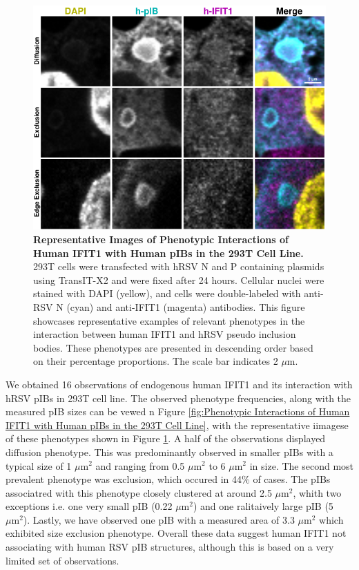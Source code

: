 \begin{figure}
    \centering
    \includegraphics[width=1\linewidth]{09. Chapter 4/Figs/01. pIB/02. IFIT1/03. i1-293t-hnhp.pdf}
    \caption[Representative Images of Phenotypic Interactions of Human IFIT1 with Human pIBs in the 293T Cell Line.]{\textbf{Representative Images of Phenotypic Interactions of Human IFIT1 with Human pIBs in the 293T Cell Line.} 293T cells were transfected with hRSV N and P containing plasmids using TransIT-X2 and were fixed after 24 hours. Cellular nuclei were stained with DAPI (yellow), and cells were double-labeled with anti-RSV N (cyan) and anti-IFIT1 (magenta) antibodies. This figure showcases representative examples of relevant phenotypes in the interaction between human IFIT1 and hRSV pseudo inclusion bodies. These phenotypes are presented in descending order based on their percentage proportions. The scale bar indicates 2 \(\mu \mbox{m}\).}
    \label{fig:Representative Images of Phenotypic Interactions of Human IFIT1 with Human pIBs in the 293T Cell Line}
\end{figure}


We obtained 16 observations of endogenous human IFIT1 and its interaction with hRSV pIBs in 293T cell line. The observed phenotype frequencies, along with the measured pIB sizes can be vewed n Figure \ref{fig:Phenotypic Interactions of Human IFIT1 with Human pIBs in the 293T Cell Line}, with the representative iimagese of these phenotypes shown in Figure \ref{fig:Representative Images of Phenotypic Interactions of Human IFIT1 with Human pIBs in the 293T Cell Line}. A half of the observations displayed diffusion phenotype. This was predominantly observed in smaller pIBs with a typical size of 1 \(\mu \mbox{m}^2\) and ranging from 0.5 \(\mu \mbox{m}^2\) to 6 \(\mu \mbox{m}^2\) in size. The second most prevalent phenotype was exclusion, which occured in 44\% of cases. The pIBs associatred with this phenotype closely clustered at around 2.5 \(\mu \mbox{m}^2\), whith two exceptions i.e. one very small pIB (0.22 \(\mu \mbox{m}^2\)) and one ralitaively large pIB (5 \(\mu \mbox{m}^2\)). Lastly, we have observed one pIB with a measured area of 3.3 \(\mu \mbox{m}^2\) which exhibited size exclusion phenotype. Overall these data suggest human IFIT1 not associating with human RSV pIB structures, although this is based on a very limited set of observations.

